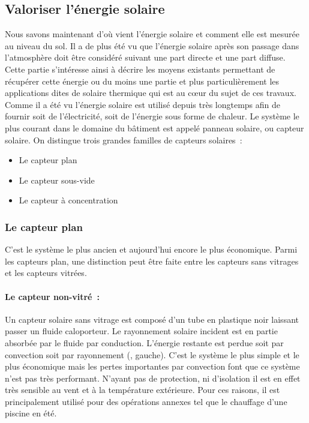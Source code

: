 \subsection{Valoriser l’énergie solaire} %
\label{sub:valoriser_l_energie_solaire}
Nous savons maintenant d’où vient l’énergie solaire et comment elle est mesurée
au niveau du sol. Il a de plus été vu que l’énergie solaire après son passage dans
l’atmosphère doit être considéré suivant une part directe et une part diffuse.
Cette partie s’intéresse ainsi à décrire les moyens existants permettant de récupérer
cette énergie ou du moins une partie et plus particulièrement les applications
dites de solaire thermique qui est au cœur du sujet de ces travaux. Comme il a été
vu l’énergie solaire est utilisé depuis très longtemps afin de fournir soit de l’électricité,
soit de l’énergie sous forme de chaleur.
Le système le plus courant dans le domaine du bâtiment est appelé panneau solaire, ou capteur solaire.
On distingue trois grandes familles de capteurs solaires~:
\begin{itemize}
    \item Le capteur plan
    \item Le capteur sous-vide
    \item Le capteur à concentration
\end{itemize}


\subsubsection{Le capteur plan} %
\label{ssub:le_capteur_plan}
C’est le système le plus ancien et aujourd’hui encore le plus économique. Parmi les
capteurs plan, une distinction peut être faite entre les capteurs sans vitrages
et les capteurs vitrées.

\paragraph{Le capteur non-vitré~:} %
\label{par:le_capteur_non_vitre}
Un capteur solaire sans vitrage est composé d’un tube en plastique noir laissant
passer un fluide caloporteur. Le rayonnement solaire incident est en partie absorbée
par le fluide par conduction. L’énergie restante est perdue soit par convection soit
par rayonnement (, gauche). C’est le système le plus simple
et le plus économique mais les pertes importantes par convection font que ce système
n’est pas très performant. N’ayant pas de protection, ni d’isolation il est en
effet très sensible au vent et à la température extérieure.
Pour ces raisons, il est principalement utilisé pour
des opérations annexes tel que le chauffage d’une piscine en été.

